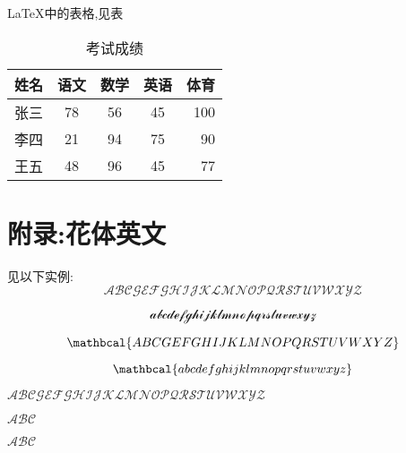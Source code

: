 \documentclass[fontset=windows]{article}
\begin{document}
    \LaTeX 中的表格,见表

    \begin{table}
        \centering
    \begin{tabular}{||l| c| c| c |r|}%
        \hline \hline
        姓名&语文&数学&英语&体育\\%
        \hline
        张三&78&56&45&100\\
        \hline
        李四&21&94&75&90\\
        \hline
        王五&48&96&45&77\\
        \hline
    \end{tabular}
    \caption{考试成绩}
    \end{table}

    \section{附录:花体英文}
    见以下实例:
    $$\mathcal{ABCGEFGHIJKLMNOPQRSTUVWXYZ}$$

    $$\mathcal{abcdefghijklmnopqrstuvwxyz}$$

    $$\mathbcal{ABCGEFGHIJKLMNOPQRSTUVWXYZ}$$

    $$\mathbcal{abcdefghijklmnopqrstuvwxyz}$$

    $\mathscr{ABCGEFGHIJKLMNOPQRSTUVWXYZ}$

    \textit{$\mathcal{ABC}$}

    \textit{$\mathscr{ABC}$}

    \label{fig:_my label}
    \label{fig-falling}%
\end{document}
